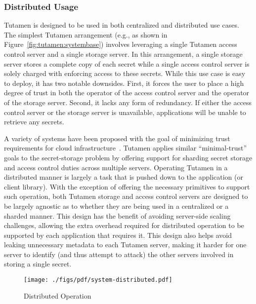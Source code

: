 \subsubsection{Distributed Usage}
\label{sec:tutamen:arch:distributed}

Tutamen is designed to be used in both centralized and distributed use
cases. The simplest Tutamen arrangement (e.g., as shown in
Figure~\ref{fig:tutamen:systembase}) involves leveraging a single
Tutamen access control server and a single storage server. In this
arrangement, a single storage server stores a complete copy of each
secret while a single access control server is solely charged with
enforcing access to these secrets. While this use case is easy to
deploy, it has two notable downsides. First, it forces the user to
place a high degree of trust in both the operator of the access
control server and the operator of the storage server. Second, it
lacks any form of redundancy. If either the access control server or
the storage server is unavailable, applications will be unable to
retrieve any secrets.

A variety of systems have been proposed with the goal of minimizing
trust requirements for cloud infrastructure~\cite{bessani2011,
  kallahalla2003, kubiatowicz2000, mahajan2011,
  wilcox-o'hearn2008}. Tutamen applies similar ``minimal-trust'' goals
to the secret-storage problem by offering support for sharding secret
storage and access control duties across multiple servers. Operating
Tutamen in a distributed manner is largely a task that is pushed down
to the application (or client library). With the exception of offering
the necessary primitives to support such operation, both Tutamen
storage and access control servers are designed to be largely agnostic
as to whether they are being used in a centralized or a sharded
manner. This design has the benefit of avoiding server-side scaling
challenges, allowing the extra overhead required for distributed
operation to be supported by each application that requires it. This
design also helps avoid leaking unnecessary metadata to each Tutamen
server, making it harder for one server to identify (and thus attempt
to attack) the other servers involved in storing a single secret.

\begin{figure}[th]
  \centering
  \texttt{[image: ./figs/pdf/system-distributed.pdf]}
  \caption{Distributed Operation}
  \label{fig:tutamen:systemdistributed}
\end{figure}

